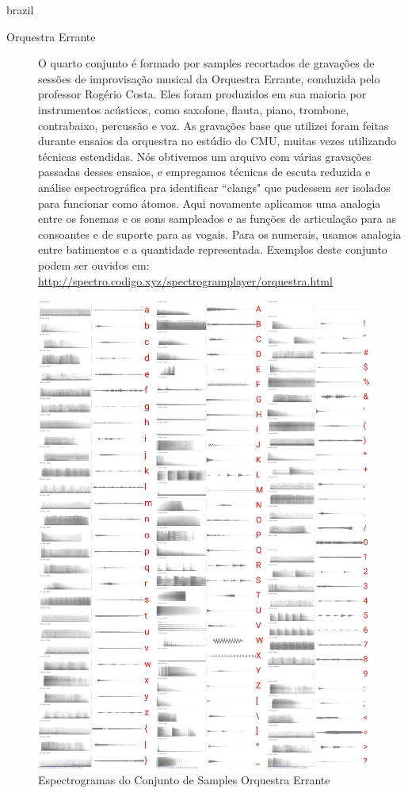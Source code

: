 \begin{otherlanguage*}{brazil}
\begin{description}
\item[Orquestra Errante] O quarto conjunto é formado por samples recortados de gravações de sessões de improvisação musical da Orquestra Errante, conduzida pelo professor Rogério Costa. Eles foram produzidos em sua maioria por instrumentos acústicos, como saxofone, flauta, piano, trombone, contrabaixo, percussão e voz. As gravações base que utilizei foram feitas durante ensaios da orquestra no estúdio do CMU, muitas vezes utilizando técnicas estendidas. Nós obtivemos um arquivo com várias gravações passadas desses ensaios, e empregamos técnicas de escuta reduzida e análise espectrográfica pra identificar ``clangs" que pudessem ser isolados para funcionar como átomos. Aqui novamente aplicamos uma analogia entre os fonemas e os sons sampleados e as funções de articulação para as consoantes e de suporte para as vogais. Para os numerais, usamos analogia entre batimentos e a quantidade representada. Exemplos deste conjunto podem ser ouvidos em: \url{http://spectro.codigo.xyz/spectrogramplayer/orquestra.html}
\end{description}

\begin{figure}[htb]
    \caption{\label{samplesorquestra}Espectrogramas do Conjunto de Samples Orquestra Errante}
    \begin{center}
        \includegraphics[width=0.7\linewidth]{pictures/cap3/bandaorquestra.jpg}
    \end{center}
\end{figure}


\end{otherlanguage*}

